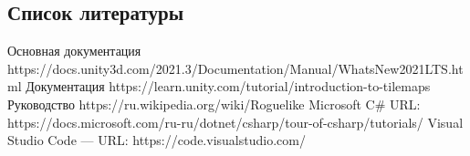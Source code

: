 \documentclass[a4paper,12pt]{article}
\begin{document}
\newpage
\large
\begin{thebibliography}{100}

\section{Список литературы}
 Основная документация https://docs.unity3d.com/2021.3/Documentation/Manual/WhatsNew2021LTS.html
 Документация https://learn.unity.com/tutorial/introduction-to-tilemaps
 Руководство https://ru.wikipedia.org/wiki/Roguelike
 Microsoft C\# URL: https://docs.microsoft.com/ru-ru/dotnet/csharp/tour-of-csharp/tutorials/
 Visual Studio Code — URL: https://code.visualstudio.com/
\end{thebibliography}

\end{document}
